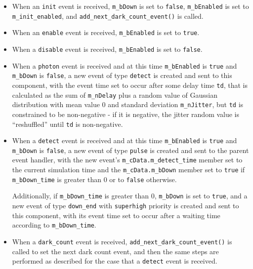 \begin{itemize}

\item When an \texttt{init} event is received, \texttt{m\_bDown} is set to \texttt{false}, \texttt{m\_bEnabled} is set to \texttt{m\_init\_enabled}, and \texttt{add\_next\_dark\_count\_event()} is called.

\item When an \texttt{enable} event is received, \texttt{m\_bEnabled} is set to \texttt{true}.

\item When a \texttt{disable} event is received, \texttt{m\_bEnabled} is set to \texttt{false}.

\item When a \texttt{photon} event is received and at this time \texttt{m\_bEnabled} is \texttt{true} and \texttt{m\_bDown} is \texttt{false}, a new event of type \texttt{detect} is created and sent to this component, with the event time set to occur after some delay time \texttt{td}, that is calculated as the sum of \texttt{m\_nDelay} plus a random value of Gaussian distribution with mean value 0 and standard deviation \texttt{m\_nJitter}, but \texttt{td} is constrained to be non-negative - if it is negative, the jitter random value is ``reshuffled'' until \texttt{td} is non-negative.

\item When a \texttt{detect} event is received and at this time \texttt{m\_bEnabled} is \texttt{true} and \texttt{m\_bDown} is \texttt{false}, a new event of type \texttt{pulse} is created and sent to the parent event handler, with the new event's \texttt{m\_cData.m\_detect\_time} member set to the current simulation time and the \texttt{m\_cData.m\_bDown} member set to \texttt{true} if \texttt{m\_bDown\_time} is greater than 0 or to \texttt{false} otherwise.

Additionally, if \texttt{m\_bDown\_time} is greater than 0, \texttt{m\_bDown} is set to \texttt{true}, and a new event of type \texttt{down\_end} with \texttt{superhigh} priority is created and sent to this component, with its event time set to occur after a waiting time according to \texttt{m\_bDown\_time}.

\item When a \texttt{dark\_count} event is received, \texttt{add\_next\_dark\_count\_event()} is called to set the next dark count event, and then the same steps are performed as described for the case that a \texttt{detect} event is received.


\end{itemize}
